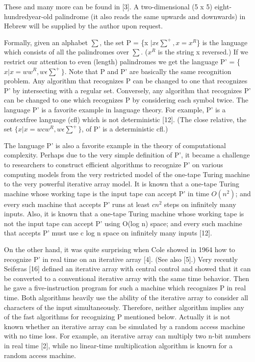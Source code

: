 \documentclass[11pt,a4paper]{report}
\begin{document}
These and many more can be found in [3]. A two-dimensional (5 x 5) eight-hundredyear-old palindrome (it also reads the same upwards and downwards) in Hebrew will
be supplied by the author upon request.

Formally, given an alphabet $\sum$, the set P = \{x $| x \epsilon \sum^{+}, x = x^R$\} is the language
which consists of all the palindromes over $\sum$. ($x^R$ is the string x reversed.) If we restrict
our attention to even (length) palindromes we get the language P’ = \{$x | x = ww^R,w \epsilon \sum^{+}\}$. 
Note that P and P’ are basically the same recognition problem. Any algorithm
that recognizes P can be changed to one that recognizes P’ by intersecting with a regular
set. Conversely, any algorithm that recognizes P’ can be changed to one which recognizes
P by considering each symbol twice.
The language P’ is a favorite example in language theory. For example, P’ is a contextfree language (cfl) which is not deterministic [12]. (The close relative, the set 
$\{x| x =wcw^R, w \epsilon \sum^{+}\}$, of P’ is a deterministic cfl.)


The language P’ is also a favorite example in the theory of computational complexity.
Perhaps due to the very simple definition of P’, it became a challenge to researchers to
construct efficient algorithms to recognize P’ on various computing models from the very
restricted model of the one-tape Turing machine to the very powerful iterative array
model. It is known that a one-tape Turing machine whose working tape is the input tape
can accept P’ in time $O(n^{2})$; and every such machine that accepts P’ runs at least $cn^{2}$
steps on infinitely many inputs. Also, it is known that a one-tape Turing machine whose
working tape is not the input tape can accept P’ using O(log n) space; and every such
machine that accepts P’ must use c log n space on infinitely many inputs [12].

On the other hand, it was quite surprising when Cole showed in 1964 how to recognize
P’ in real time on an iterative array [4]. (See also [5].) Very recently Seiferas [16] defined
an iterative array with central control and showed that it can be converted to a conventional
iterative array with the same time behavior. Then he gave a five-instruction program for
such a machine which recognizes P in real time. Both algorithms heavily use the ability
of the iterative array to consider all characters of the input simultaneously. Therefore,
neither algorithm implies any of the fast algorithms for recognizing P mentioned below.
Actually it is not known whether an iterative array can be simulated by a random access
machine with no time loss. For example, an iterative array can multiply two n-bit numbers
in real time [2], while no linear-time multiplication algorithm is known for a random
access machine.
\end{document}
